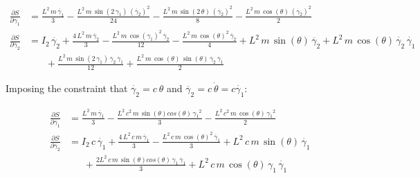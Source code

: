 \documentclass[12pt, letterpaper]{../assignment}
\begin{document}
\begin{equation*}
  \begin{aligned}
    \frac{\partial S}{\partial \ddot{\gamma_1}} &= \frac{L^2\,m\,\ddot{\gamma_1}}{3}-\frac{L^2\,m\,\sin\left(2\,\gamma _{1}\right)\,{\left(\dot{\gamma_2}\right)}^2}{24}-\frac{L^2\,m\,\sin\left(2\,\theta \right)\,{\left(\dot{\gamma_2}\right)}^2}{8}-\frac{L^2\,m\,\cos\left(\theta \right)\,{\left(\dot{\gamma_2}\right)}^2}{2} \\
    \frac{\partial S}{\partial \ddot{\gamma_2}} &= I_{2}\,\ddot{\gamma_2}+\frac{4\,L^2\,m\,\ddot{\gamma_2}}{3}-\frac{L^2\,m\,{\cos\left(\gamma _{1}\right)}^2\,\ddot{\gamma_2}}{12}-\frac{L^2\,m\,{\cos\left(\theta \right)}^2\,\ddot{\gamma_2}}{4}+L^2\,m\,\sin\left(\theta \right)\,\ddot{\gamma_2}+L^2\,m\,\cos\left(\theta \right)\,\dot{\gamma_2}\,\dot{\gamma_1}\\
    &\ \ \ \ \ \ \ \ +\frac{L^2\,m\,\sin\left(2\,\gamma _{1}\right)\,\dot{\gamma_2}\,\dot{\gamma_1}}{12}+\frac{L^2\,m\,\cos\left(\theta \right)\,\sin\left(\theta \right)\,\dot{\gamma_2}\,\dot{\gamma_1}}{2}
  \end{aligned}
\end{equation*}

Imposing the constraint that $\dot{\gamma_2} = c\ \theta $ and $\ddot{\gamma_2} = c\ \dot{\theta} = c \dot{\gamma_1} $:

\begin{equation*}
  \begin{aligned}
    \frac{\partial S}{\partial \ddot{\gamma_1}} &= \frac{L^2\,m\,\ddot{\gamma_1}}{3}-\frac{L^2\,c^2\,m\,\sin\left(\theta \right)cos\left(\theta \right)\,{\gamma _{1}}^2}{3}-\frac{L^2\,c^2\,m\,\cos\left(\theta \right)\,{\gamma _{1}}^2}{2} \\
    \frac{\partial S}{\partial \ddot{\gamma_2}} &= I_{2}\,c\,\dot{\gamma_1}+\frac{4\,L^2\,c\,m\,\dot{\gamma_1}}{3}-\frac{L^2\,c\,m\,{\cos\left(\theta \right)}^2\,\dot{\gamma_1}}{3}+L^2\,c\,m\,\sin\left(\theta \right)\,\dot{\gamma_1}\\
    & \ \ \ \ \ \ \ +\frac{2 L^2\,c\,m\,\sin\left(\theta \right)cos\left(\theta \right)\,\gamma _{1}\,\dot{\gamma_1}}{3}+L^2\,c\,m\,\cos\left(\theta \right)\,\gamma _{1}\,\dot{\gamma_1}
  \end{aligned}
\end{equation*}


 

\end{document}
